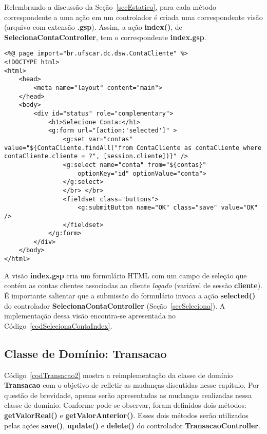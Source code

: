 Relembrando   a   discussão  da   Seção~\ref{secEstatico},   para  cada   método
correspondente a  uma ação em um  controlador é criada  uma correspondente visão
(arquivo  com  extensão {\bf  .gsp}).   Assim, a  ação  {\bf  index()}, de  {\bf
  SelecionaContaController}, tem o correspondente {\bf index.gsp}.  

\begin{lstlisting}[caption=Visão   {\bf  selecionaConta/index.gsp},  frame=trBL,
    float=htbp, label=codSelecionaContaIndex] 
<%@ page import="br.ufscar.dc.dsw.ContaCliente" %>
<!DOCTYPE html>
<html>
    <head> 
        <meta name="layout" content="main"> 
    </head>
    <body>
        <div id="status" role="complementary">
            <h1>Selecione Conta:</h1>
            <g:form url="[action:'selected']" >
                <g:set var="contas" value="${ContaCliente.findAll("from ContaCliente as contaCliente where contaCliente.cliente = ?", [session.cliente])}" />
                <g:select name="conta" from="${contas}" 
                    optionKey="id" optionValue="conta">
                </g:select>
                </br> </br>
                <fieldset class="buttons">
                    <g:submitButton name="OK" class="save" value="OK" />
                </fieldset>
            </g:form>
        </div>
    </body>
</html>
\end{lstlisting}

A visão  {\bf index.gsp}  cria um formulário  HTML com  um campo de  seleção que
contém as contas clientes associadas ao cliente {\it logado} (variável de sessão
{\bf cliente}).  É  importante salientar que a submissão  do formulário invoca a
ação   {\bf   selected()}    do   controlador   {\bf   SelecionaContaController}
(Seção~\ref{secSeleciona}). A implementação  dessa visão encontra-se apresentada
no Código~\ref{codSelecionaContaIndex}.

\subsection{Classe de Domínio: Transacao}

\vspace{0.2cm}

Código~\ref{codTransacao2} mostra  a reimplementação  da classe de  domínio {\bf
  Transacao} com o  objetivo de refletir as mudanças  discutidas nesse capítulo.
Por questão de brevidade, apenas serão apresentadas as mudanças realizadas nessa
classe  de domínio.  Conforme  pode-se observar,  foram definidos  dois métodos:
{\bf  getValorReal()}  e  {\bf  getValorAnterior()}. Esses  dois  métodos  serão
utilizados  pelas  ações  {\bf  save()},  {\bf update()}  e  {\bf  delete()}  do
controlador {\bf TransacaoController}.  

